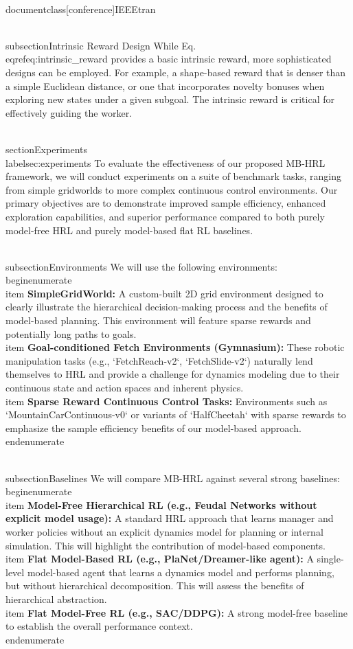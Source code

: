 \\documentclass[conference]{IEEEtran}
\begin{document}
\\subsection{Intrinsic Reward Design}
While Eq. \\eqref{eq:intrinsic_reward} provides a basic intrinsic reward, more sophisticated designs can be employed. For example, a shape-based reward that is denser than a simple Euclidean distance, or one that incorporates novelty bonuses when exploring new states under a given subgoal. The intrinsic reward is critical for effectively guiding the worker.

\\section{Experiments} \\label{sec:experiments}
To evaluate the effectiveness of our proposed MB-HRL framework, we will conduct experiments on a suite of benchmark tasks, ranging from simple gridworlds to more complex continuous control environments. Our primary objectives are to demonstrate improved sample efficiency, enhanced exploration capabilities, and superior performance compared to both purely model-free HRL and purely model-based flat RL baselines.

\\subsection{Environments}
We will use the following environments:
\\begin{enumerate}
    \\item \textbf{SimpleGridWorld:} A custom-built 2D grid environment designed to clearly illustrate the hierarchical decision-making process and the benefits of model-based planning. This environment will feature sparse rewards and potentially long paths to goals.
    \\item \textbf{Goal-conditioned Fetch Environments (Gymnasium):} These robotic manipulation tasks (e.g., `FetchReach-v2`, `FetchSlide-v2`) naturally lend themselves to HRL and provide a challenge for dynamics modeling due to their continuous state and action spaces and inherent physics.
    \\item \textbf{Sparse Reward Continuous Control Tasks:} Environments such as `MountainCarContinuous-v0` or variants of `HalfCheetah` with sparse rewards to emphasize the sample efficiency benefits of our model-based approach.
\\end{enumerate}

\\subsection{Baselines}
We will compare MB-HRL against several strong baselines:
\\begin{enumerate}
    \\item \textbf{Model-Free Hierarchical RL (e.g., Feudal Networks without explicit model usage):} A standard HRL approach that learns manager and worker policies without an explicit dynamics model for planning or internal simulation. This will highlight the contribution of model-based components.
    \\item \textbf{Flat Model-Based RL (e.g., PlaNet/Dreamer-like agent):} A single-level model-based agent that learns a dynamics model and performs planning, but without hierarchical decomposition. This will assess the benefits of hierarchical abstraction.
    \\item \textbf{Flat Model-Free RL (e.g., SAC/DDPG):} A strong model-free baseline to establish the overall performance context.
\\end{enumerate}
\end{document}
